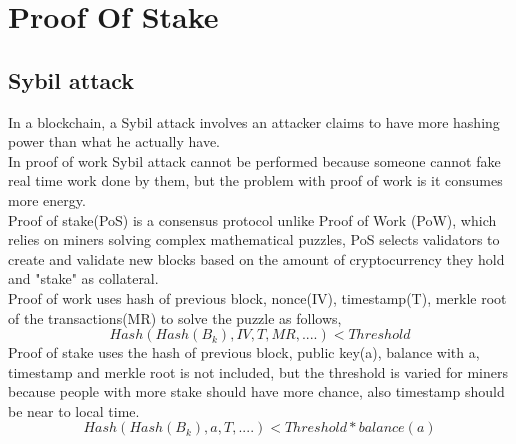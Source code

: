 \documentclass{article}
\begin{document}
\section{Proof Of Stake}
\subsection{Sybil attack}
In a blockchain, a Sybil attack involves an attacker claims to have more hashing power than what he actually have. \\
In proof of work Sybil attack cannot be performed because someone cannot fake real time work done by them, but the problem with proof of work is it consumes more energy.\\
Proof of stake(PoS) is a consensus protocol unlike Proof of Work (PoW), which relies on miners solving complex mathematical puzzles, PoS selects validators to create and validate new blocks based on the amount of cryptocurrency they hold and "stake" as collateral.\\ 
Proof of work uses hash of previous block, nonce(IV), timestamp(T), merkle root of the transactions(MR) to solve the puzzle as follows,
\begin{equation*}
    Hash(Hash(B_{k}),IV,T,MR, ....) < Threshold
\end{equation*}
Proof of stake uses the hash of previous block, public key(a), balance with a, timestamp and merkle root is not included, but the threshold is varied for miners because people with more stake should have more chance, also timestamp should be near to local time. \\
\begin{equation*}
    Hash(Hash(B_{k}),a,T, ....) < Threshold*balance(a)
\end{equation*}
\end{document}
